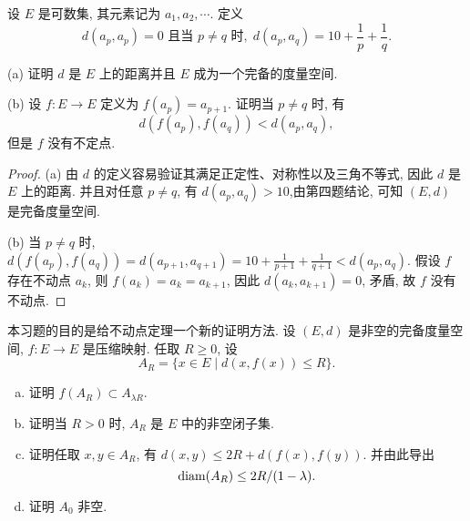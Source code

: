 \begin{exercise}
    设 $E$ 是可数集, 其元素记为 $a_1,a_2,\cdots$. 定义
    \[d(a_p,a_p)=0\text{\ 且当\ }p\neq q\text{\ 时},\; d(a_p,a_q)=10+\frac{1}{p}+\frac{1}{q}.\]

    (a) 证明 $d$ 是 $E$ 上的距离并且 $E$ 成为一个完备的度量空间.

    (b) 设 $f:E\to E$ 定义为 $f(a_p)=a_{p+1}$. 证明当 $p\neq q$ 时, 有
    \[d(f(a_p),f(a_q))<d(a_p,a_q),\]
    但是 $f$ 没有不定点.
\end{exercise}

\begin{proof}
    (a) 由 $d$ 的定义容易验证其满足正定性、对称性以及三角不等式, 因此 $d$ 是 $E$ 上的距离.
    并且对任意 $p\neq q$, 有 $d(a_p,a_q)>10$,由第四题结论, 可知 $(E,d)$ 是完备度量空间.

    (b) 当 $p\neq q$ 时, $d(f(a_p),f(a_q))=d(a_{p+1},a_{q+1})=10+\frac{1}{p+1}+\frac{1}{q+1}<d(a_p,a_q)$.
    假设 $f$ 存在不动点 $a_k$, 则 $f(a_k)=a_k=a_{k+1}$,
    因此 $d(a_k,a_{k+1})=0$, 矛盾, 故 $f$ 没有不动点.
\end{proof}



\begin{exercise}
    本习题的目的是给不动点定理一个新的证明方法.
    设 $(E,d)$ 是非空的完备度量空间, $f:E\to E$ 是压缩映射. 任取 $R\geq 0$, 设
    \[A_R=\{x\in E\mid d(x,f(x))\leq R\}.\]
    \begin{enumerate}[(a)]
        \item 证明 $f(A_R)\subset A_{\lambda R}$.
        \item 证明当 $R>0$ 时, $A_R$ 是 $E$ 中的非空闭子集.
        \item 证明任取 $x,y\in A_R$, 有 $d(x,y)\leq 2R+d(f(x),f(y))$. 并由此导出
              \[\operatorname{diam}(A_R)\leq 2R/(1-\lambda).\]
        \item 证明 $A_0$ 非空.
    \end{enumerate}
\end{exercise}

